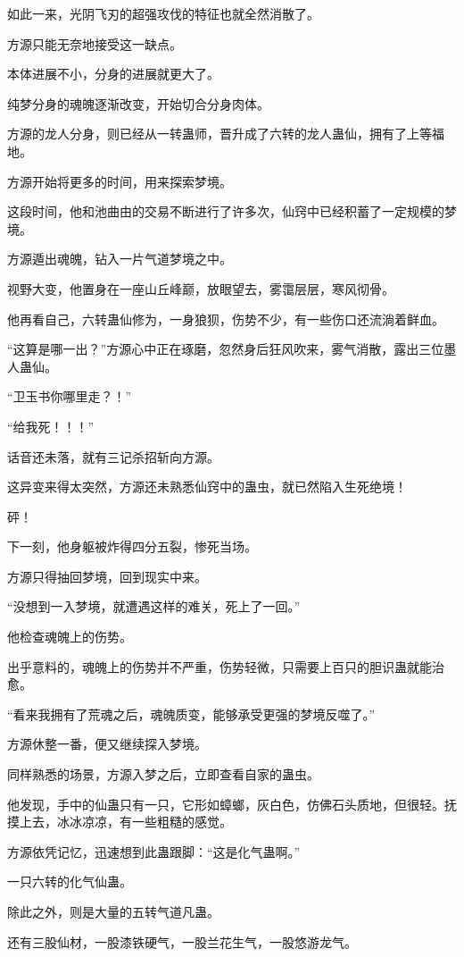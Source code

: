 \begin{this_body}
如此一来，光阴飞刃的超强攻伐的特征也就全然消散了。

方源只能无奈地接受这一缺点。

本体进展不小，分身的进展就更大了。

纯梦分身的魂魄逐渐改变，开始切合分身肉体。

方源的龙人分身，则已经从一转蛊师，晋升成了六转的龙人蛊仙，拥有了上等福地。

方源开始将更多的时间，用来探索梦境。

这段时间，他和池曲由的交易不断进行了许多次，仙窍中已经积蓄了一定规模的梦境。

方源遁出魂魄，钻入一片气道梦境之中。

视野大变，他置身在一座山丘峰巅，放眼望去，雾霭层层，寒风彻骨。

他再看自己，六转蛊仙修为，一身狼狈，伤势不少，有一些伤口还流淌着鲜血。

“这算是哪一出？”方源心中正在琢磨，忽然身后狂风吹来，雾气消散，露出三位墨人蛊仙。

“卫玉书你哪里走？！”

“给我死！！！”

话音还未落，就有三记杀招斩向方源。

这异变来得太突然，方源还未熟悉仙窍中的蛊虫，就已然陷入生死绝境！

砰！

下一刻，他身躯被炸得四分五裂，惨死当场。

方源只得抽回梦境，回到现实中来。

“没想到一入梦境，就遭遇这样的难关，死上了一回。”

他检查魂魄上的伤势。

出乎意料的，魂魄上的伤势并不严重，伤势轻微，只需要上百只的胆识蛊就能治愈。

“看来我拥有了荒魂之后，魂魄质变，能够承受更强的梦境反噬了。”

方源休整一番，便又继续探入梦境。

同样熟悉的场景，方源入梦之后，立即查看自家的蛊虫。

他发现，手中的仙蛊只有一只，它形如蟑螂，灰白色，仿佛石头质地，但很轻。抚摸上去，冰冰凉凉，有一些粗糙的感觉。

方源依凭记忆，迅速想到此蛊跟脚：“这是化气蛊啊。”

一只六转的化气仙蛊。

除此之外，则是大量的五转气道凡蛊。

还有三股仙材，一股漆铁硬气，一股兰花生气，一股悠游龙气。


\end{this_body}
